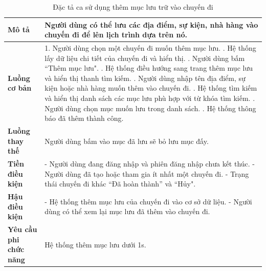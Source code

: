 \begin{longtable}{| p{4cm} | p{\dimexpr\linewidth-4cm-4\tabcolsep} |} %
    \caption{Đặc tả ca sử dụng thêm mục lưu trữ vào chuyến đi} %
    \label{tab:uc_add_saved_item_spec} \\ %

    \hline
    \textbf{Mô tả} & Người dùng có thể lưu các địa điểm, sự kiện, nhà hàng vào chuyến đi để lên lịch trình dựa trên nó. \\
    \hline
    \endfirsthead %



    \hline %
    \endlastfoot

    \textbf{Luồng cơ bản} & 1. Người dùng chọn một chuyến đi muốn thêm mục lưu. \newline
                           2. Hệ thống lấy dữ liệu chi tiết của chuyến đi và hiển thị. \newline
                           3. Người dùng bấm ``Thêm mục lưu". \newline
                           4. Hệ thống điều hướng sang trang thêm mục lưu và hiển thị thanh tìm kiếm. \newline
                           5. Người dùng nhập tên địa điểm, sự kiện hoặc nhà hàng muốn thêm vào chuyến đi. \newline
                           6. Hệ thống tìm kiếm và hiển thị danh sách các mục lưu phù hợp với từ khóa tìm kiếm. \newline
                           7. Người dùng chọn mục muốn lưu trong danh sách. \newline
                           8. Hệ thống thông báo đã thêm thành công. \\
    \hline
    \textbf{Luồng thay thế} & Người dùng bấm vào mục đã lưu sẽ bỏ lưu mục đấy. \\
    \hline
    \textbf{Tiền điều kiện} & - Người dùng đang đăng nhập và phiên đăng nhập chưa kết thúc.\newline
                           - Người dùng đã tạo hoặc tham gia ít nhất một chuyến đi. \newline
                           - Trạng thái chuyến đi khác ``Đã hoàn thành'' và ``Hủy". \\
    \hline
    \textbf{Hậu điều kiện} & - Hệ thống thêm mục lưu của chuyến đi vào cơ sở dữ liệu.\newline
                           - Người dùng có thể xem lại mục lưu đã thêm vào chuyến đi. \\
    \hline
    \textbf{Yêu cầu phi chức năng} & Hệ thống thêm mục lưu dưới 1s. \\

\end{longtable}


